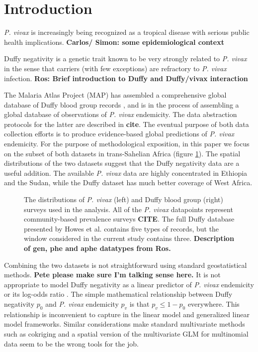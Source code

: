 \documentclass[10pt]{article}
\begin{document}
\section*{Introduction}

\emph{P. vivax} is increasingly being recognized as a tropical disease with serious public health implications. \textbf{Carlos/ Simon: some epidemiological context}

Duffy negativity is a genetic trait known to be very strongly related to \emph{P. vivax} in the sense that carriers (with few exceptions) are refractory to \emph{P. vivax} infection. \textbf{Ros: Brief introduction to Duffy and Duffy/vivax interaction}

\medskip
The Malaria Atlas Project (MAP) has assembled a comprehensive global database of Duffy blood group records \cite{howes:2010}, and is in the process of assembling a global database of observations of \emph{P. vivax} endemicity. The data abstraction protocols for the latter are described in \textbf{cite}. The eventual purpose of both data collection efforts is to produce evidence-based global predictions of \emph{P. vivax} endemicity. For the purpose of methodological exposition, in this paper we focus on the subset of both datasets in trans-Sahelian Africa (figure \ref{fig:datasets}). The spatial distributions of the two datasets suggest that the Duffy negativity data are a useful addition. The available \emph{P. vivax} data are highly concentrated in Ethiopia and the Sudan, while the Duffy dataset has much better coverage of West Africa.

\begin{figure}
    \begin{center}
        \caption{The distributions of \emph{P. vivax} (left) and Duffy blood group (right) surveys used in the analysis. All of the \emph{P. vivax} datapoints represent community-based prevalence surveys \textbf{CITE}. The full Duffy database presented by Howes et al. \cite{howes:2010} contains five types of records, but the window considered in the current study contains three. \textbf{Description of gen, phe and aphe datatypes from Ros.}} 
    \label{fig:datasets}
    \end{center}    
\end{figure}

Combining the two datasets is not straightforward using standard geostatistical methods. \textbf{Pete please make sure I'm talking sense here.} It is not appropriate to model Duffy negativity as a linear predictor of \emph{P. vivax} endemicity \cite{goovaerts:1997,wackernagel:2003} or its log-odds ratio \cite{banerjee:2004,mccullagh:1999}. The simple mathematical relationship between Duffy negativity $p_0$ and \emph{P. vivax} endemicity $p_v$ is that $p_v\le 1-p_0$ everywhere. This relationship is inconvenient to capture in the linear model and generalized linear model frameworks. Similar considerations make standard multivariate methods such as cokriging \cite{wackernagel:2003} and a spatial version of the multivariate GLM \cite{mccullagh:1999} for multinomial data seem to be the wrong tools for the job.
\end{document}
